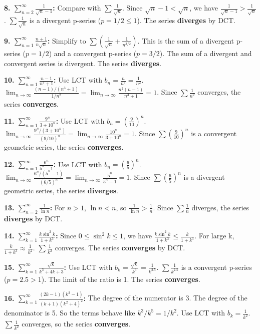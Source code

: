 \documentclass{article}
\begin{document}
\textbf{8. \(\sum_{n=2}^{\infty} \frac{1}{\sqrt{n}-1}\):} Compare with \(\sum \frac{1}{\sqrt{n}}\). Since \(\sqrt{n}-1 < \sqrt{n}\), we have \(\frac{1}{\sqrt{n}-1} > \frac{1}{\sqrt{n}}\). \(\sum \frac{1}{\sqrt{n}}\) is a divergent p-series (\(p=1/2 \le 1\)). The series \textbf{diverges} by DCT.

\textbf{9. \(\sum_{n=1}^{\infty} \frac{n+1}{n\sqrt{n}}\):} Simplify to \(\sum (\frac{1}{\sqrt{n}} + \frac{1}{n^{3/2}})\). This is the sum of a divergent p-series (\(p=1/2\)) and a convergent p-series (\(p=3/2\)). The sum of a divergent and convergent series is divergent. The series \textbf{diverges}.

\textbf{10. \(\sum_{n=1}^{\infty} \frac{n-1}{n^3+1}\):} Use LCT with \(b_n = \frac{n}{n^3} = \frac{1}{n^2}\). \(\lim_{n \to \infty} \frac{(n-1)/(n^3+1)}{1/n^2} = \lim_{n \to \infty} \frac{n^2(n-1)}{n^3+1} = 1\). Since \(\sum \frac{1}{n^2}\) converges, the series \textbf{converges}.

\textbf{11. \(\sum_{n=1}^{\infty} \frac{9^n}{3+10^n}\):} Use LCT with \(b_n = (\frac{9}{10})^n\). \(\lim_{n \to \infty} \frac{9^n/(3+10^n)}{(9/10)^n} = \lim_{n \to \infty} \frac{10^n}{3+10^n} = 1\). Since \(\sum (\frac{9}{10})^n\) is a convergent geometric series, the series \textbf{converges}.

\textbf{12. \(\sum_{n=1}^{\infty} \frac{6^n}{5^n-1}\):} Use LCT with \(b_n = (\frac{6}{5})^n\). \(\lim_{n \to \infty} \frac{6^n/(5^n-1)}{(6/5)^n} = \lim_{n \to \infty} \frac{5^n}{5^n-1} = 1\). Since \(\sum (\frac{6}{5})^n\) is a divergent geometric series, the series \textbf{diverges}.

\textbf{13. \(\sum_{n=2}^{\infty} \frac{1}{\ln n}\):} For \(n>1\), \(\ln n < n\), so \(\frac{1}{\ln n} > \frac{1}{n}\). Since \(\sum \frac{1}{n}\) diverges, the series \textbf{diverges} by DCT.

\textbf{14. \(\sum_{k=1}^{\infty} \frac{k \sin^2 k}{1+k^3}\):} Since \(0 \le \sin^2 k \le 1\), we have \(\frac{k \sin^2 k}{1+k^3} \le \frac{k}{1+k^3}\). For large k, \(\frac{k}{1+k^3} \approx \frac{1}{k^2}\). \(\sum \frac{1}{k^2}\) converges. The series \textbf{converges} by DCT.

\textbf{15. \(\sum_{k=1}^{\infty} \frac{\sqrt{k}}{k^3+4k+3}\):} Use LCT with \(b_k = \frac{\sqrt{k}}{k^3} = \frac{1}{k^{2.5}}\). \(\sum \frac{1}{k^{2.5}}\) is a convergent p-series (\(p=2.5>1\)). The limit of the ratio is 1. The series \textbf{converges}.

\textbf{16. \(\sum_{k=1}^{\infty} \frac{(2k-1)(k^2-1)}{(k+1)(k^2+4)^2}\):} The degree of the numerator is 3. The degree of the denominator is 5. So the terms behave like \(k^3/k^5 = 1/k^2\). Use LCT with \(b_k = \frac{1}{k^2}\). \(\sum \frac{1}{k^2}\) converges, so the series \textbf{converges}.
\end{document}
